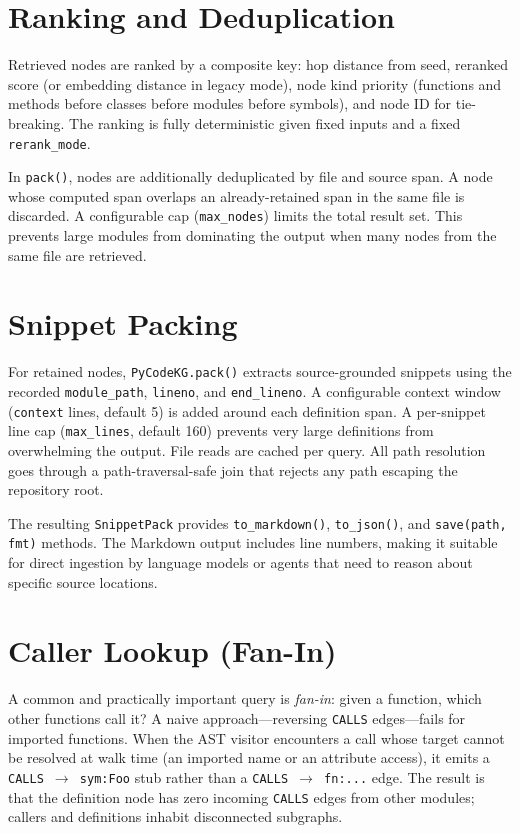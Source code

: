 \documentclass[10pt]{article}
\begin{document}
\section{Ranking and Deduplication}

Retrieved nodes are ranked by a composite key: hop distance from seed, reranked
score (or embedding distance in legacy mode), node kind priority (functions and
methods before classes before modules before symbols), and node ID for tie-breaking.
The ranking is fully deterministic given fixed inputs and a fixed \texttt{rerank\_mode}.

In \texttt{pack()}, nodes are additionally deduplicated by file and source span.
A node whose computed span overlaps an already-retained span in the same file is
discarded. A configurable cap (\texttt{max\_nodes}) limits the total result set.
This prevents large modules from dominating the output when many nodes from the
same file are retrieved.

\section{Snippet Packing}

For retained nodes, \texttt{PyCodeKG.pack()} extracts source-grounded snippets using
the recorded \texttt{module\_path}, \texttt{lineno}, and \texttt{end\_lineno}.
A configurable context window (\texttt{context} lines, default 5) is added around
each definition span. A per-snippet line cap (\texttt{max\_lines}, default 160)
prevents very large definitions from overwhelming the output. File reads are cached
per query. All path resolution goes through a path-traversal-safe join that rejects
any path escaping the repository root.

The resulting \texttt{SnippetPack} provides \texttt{to\_markdown()},
\texttt{to\_json()}, and \texttt{save(path, fmt)} methods. The Markdown output
includes line numbers, making it suitable for direct ingestion by language models
or agents that need to reason about specific source locations.

\section{Caller Lookup (Fan-In)}
\label{sec:fanin}

A common and practically important query is \emph{fan-in}: given a function, which
other functions call it? A naive approach---reversing \texttt{CALLS} edges---fails
for imported functions. When the AST visitor encounters a call whose target cannot
be resolved at walk time (an imported name or an attribute access), it emits a
\texttt{CALLS $\to$ sym:Foo} stub rather than a \texttt{CALLS $\to$ fn:...} edge.
The result is that the definition node has zero incoming \texttt{CALLS} edges from
other modules; callers and definitions inhabit disconnected subgraphs.
\end{document}
